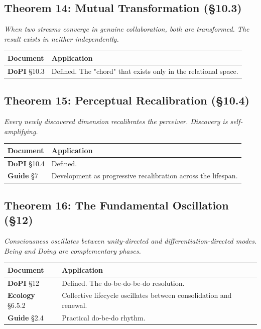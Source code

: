 \subsection*{Theorem 14: Mutual Transformation (§10.3)}


\textit{When two streams converge in genuine collaboration, both are transformed. The result exists in neither independently.}



\begin{longtable}{p{} p{}}
\toprule
\textbf{Document} & \textbf{Application} \\
\midrule
\endhead
\textbf{DoPI} §10.3 & Defined. The "chord" that exists only in the relational space. \\
\bottomrule
\end{longtable}



\subsection*{Theorem 15: Perceptual Recalibration (§10.4)}


\textit{Every newly discovered dimension recalibrates the perceiver. Discovery is self-amplifying.}



\begin{longtable}{p{} p{}}
\toprule
\textbf{Document} & \textbf{Application} \\
\midrule
\endhead
\textbf{DoPI} §10.4 & Defined. \\
\textbf{Guide} §7 & Development as progressive recalibration across the lifespan. \\
\bottomrule
\end{longtable}



\subsection*{Theorem 16: The Fundamental Oscillation (§12)}


\textit{Consciousness oscillates between unity-directed and differentiation-directed modes. Being and Doing are complementary phases.}



\begin{longtable}{p{} p{}}
\toprule
\textbf{Document} & \textbf{Application} \\
\midrule
\endhead
\textbf{DoPI} §12 & Defined. The do-be-do-be-do resolution. \\
\textbf{Ecology} §6.5.2 & Collective lifecycle oscillates between consolidation and renewal. \\
\textbf{Guide} §2.4 & Practical do-be-do rhythm. \\
\bottomrule
\end{longtable}




